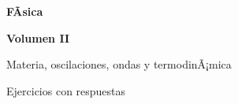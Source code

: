 ﻿\documentclass[11pt,letterpaper,openany]{book}
\newcommand{\numerovolumen}{II}
\newcommand{\nombrevolumen}{Materia, oscilaciones, ondas y termodinÃ¡mica}
\begin{document}

\begin{titlepage}

    \centering

    \vspace*{2.5cm}

    {\color{RojoPrincipal}
    \Huge\bfseries
    FÃ­sica
    \par}

    \vspace{0.8cm}

    {\color{AzulPrincipal}
    \LARGE\bfseries
    Volumen \numerovolumen
    \par}

    \vspace{0.5cm}

    {\Large
    \nombrevolumen
    \par}

    \vspace{1.5cm}

    {\color{AzulPrincipal}
    \Large
    Ejercicios con respuestas
    \par}

    \vfill

    {\Large\bfseries
    \autorlibro
    \par}

    \vspace{2cm}

\end{titlepage}



\frontmatter

\tableofcontents

\cleardoublepage



\mainmatter
\end{document}
